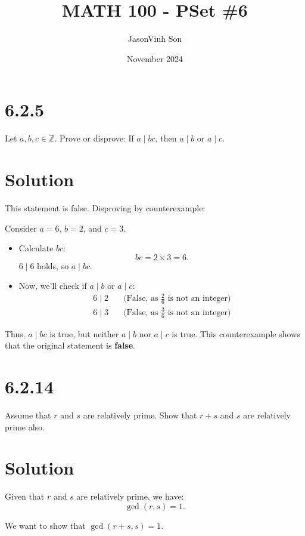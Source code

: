 \documentclass{article}
\title{MATH 100 - PSet \#6}
\author{JasonVinh Son}
\date{November 2024}
\begin{document}
\maketitle

\section*{6.2.5}
Let \( a, b, c \in \mathbb{Z} \). Prove or disprove: If \( a \mid bc \), then \( a \mid b \) or \( a \mid c \).

\section*{Solution}
This statement is false. Disproving by counterexample:

Consider \( a = 6 \), \( b = 2 \), and \( c = 3 \).

\begin{itemize}
    \item Calculate \( bc \):
    \[
    bc = 2 \times 3 = 6.
    \]
    \( 6 \mid 6 \) holds, so \( a \mid bc \).

    \item Now, we'll check if \( a \mid b \) or \( a \mid c \):
    \begin{align*}
        6 \mid 2 & \quad \text{(False, as } \frac{2}{6} \text{ is not an integer)} \\
        6 \mid 3 & \quad \text{(False, as } \frac{3}{6} \text{ is not an integer)}
    \end{align*}
\end{itemize}

Thus, \( a \mid bc \) is true, but neither \( a \mid b \) nor \( a \mid c \) is true. This counterexample shows that the original statement is \textbf{false}.

\medskip

\section*{6.2.14}
Assume that \( r \) and \( s \) are relatively prime. Show that \( r + s \) and \( s \) are relatively prime also.

\section*{Solution}
Given that \( r \) and \( s \) are relatively prime, we have:
\[
\gcd(r, s) = 1.
\]

We want to show that \( \gcd(r + s, s) = 1 \).
\end{document}
